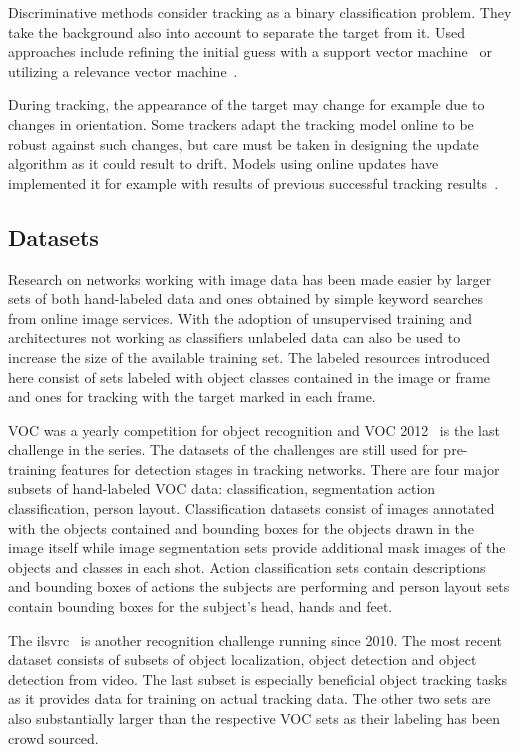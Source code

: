 Discriminative methods consider tracking as a binary classification problem. They take
the background also into account to separate the target from it. Used approaches
include refining the initial guess with a support vector machine~\cite{SVT} or utilizing
a relevance vector machine~\cite{SPARSE_BAYESIAN}.

During tracking, the appearance of the target may change for example due to changes in
orientation. Some trackers adapt the tracking model online to be robust against such
changes, but care must be taken in designing the update algorithm as it could result
to drift. Models using online updates have implemented it for example with results of
previous successful tracking results~\cite{BLUR_TRACK}.

\subsection{Datasets}
Research on networks working with image data has been made easier by larger sets of both
hand-labeled data and ones obtained by simple keyword searches from online image services.
With the adoption of unsupervised training and architectures not working as classifiers
unlabeled data can also be used to increase the size of the available training set.
The labeled resources introduced here consist of sets labeled with object classes contained
in the image or frame and ones for tracking with the target marked in each frame.

VOC was a yearly competition for object recognition and VOC 2012~\cite{VOC12} is the last
challenge in the series. The datasets of the challenges are still used for pre-training
features for detection stages in tracking networks. There are four major subsets of
hand-labeled VOC data: classification, segmentation action classification, person layout.
Classification datasets consist of images annotated with the objects contained and bounding
boxes for the objects drawn in the image itself while image segmentation sets provide
additional mask images of the objects and classes in each shot. Action classification sets
contain descriptions and bounding boxes of actions the subjects are performing and person
layout sets contain bounding boxes for the subject's head, hands and feet.

The \ac{ilsvrc}~\cite{ILSVRC15} is another recognition challenge running since 2010. The
most recent dataset consists of subsets of object localization, object detection and
object detection from video. The last subset is especially beneficial object tracking
tasks as it provides data for training on actual tracking data. The other two sets are also
substantially larger than the respective VOC sets as their labeling has been crowd sourced.

